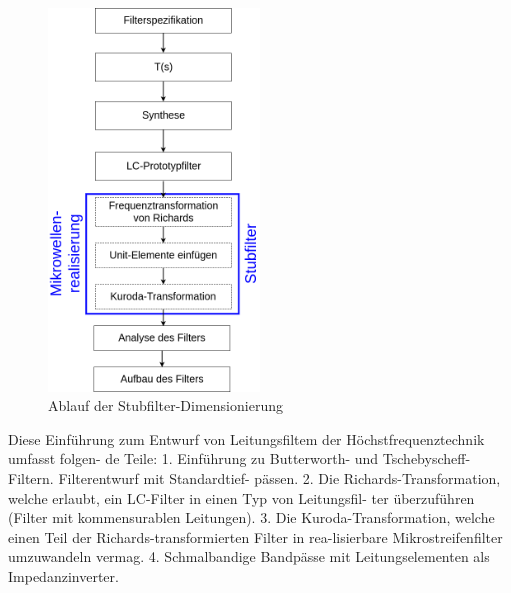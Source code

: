 \begin{figure}[h!]
\centering
 	\includegraphics[width=0.5\textwidth]{Ablauf_Filterdimensionierung.png}
 	\caption{Ablauf der Stubfilter-Dimensionierung}
 	\label{fig:Ablauf_Filterdimensionierung}
\end{figure}

















Diese Einführung zum Entwurf von Leitungsfiltem der Höchstfrequenztechnik umfasst folgen-
de Teile:
1. Einführung zu Butterworth- und Tschebyscheff-Filtern. Filterentwurf mit Standardtief-
pässen.
2. Die Richards-Transformation, welche erlaubt, ein LC-Filter in einen Typ von Leitungsfil-
ter überzuführen (Filter mit kommensurablen Leitungen).
3. Die Kuroda-Transformation, welche einen Teil der Richards-transformierten Filter in rea-lisierbare Mikrostreifenfilter umzuwandeln vermag.
4. Schmalbandige Bandpässe mit Leitungselementen als Impedanzinverter.








